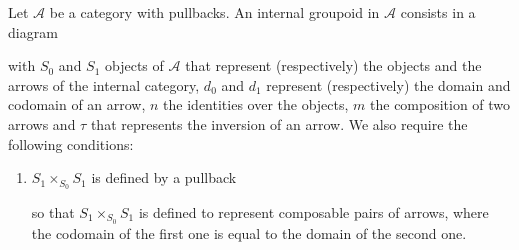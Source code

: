 \begin{definition}
\label{def:InternalGroupoid}
    Let $\mathcal{A}$ be a category with pullbacks. An internal groupoid in $\mathcal{A}$ consists in a diagram
    \begin{center}
    \end{center}
    with $S_0$ and $S_1$ objects of $\mathcal{A}$ that represent (respectively) the objects and the arrows of the internal category, $d_0$ and $d_1$ represent (respectively) the domain and codomain of an arrow, $n$ the identities over the objects, $m$ the composition of two arrows and $\tau$ that represents the inversion of an arrow. We also require the following conditions:
    \begin{enumerate}[\bfseries (G1)]
    
        \item $S_1\times_{S_0}S_1$ is defined by a pullback
        \begin{center}
        \end{center}
        so that $S_1\times_{S_0}S_1$ is defined to represent composable pairs of arrows, where the codomain of the first one is equal to the domain of the second one.
        

\end{enumerate}
\end{definition}

